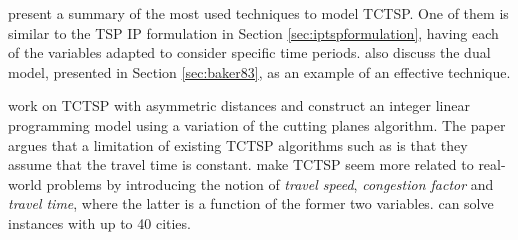 \documentclass{mprop}
\theoremstyle{definition}
\begin{document}


\citet{tspbible} present a summary of the most used techniques to model TCTSP. One of them is similar to the TSP IP formulation in Section \ref{sec:iptspformulation}, having each of the variables adapted to consider specific time periods. \citet{tspbible} also discuss the dual model, presented in Section \ref{sec:baker83}, as an example of an effective technique.

\citet{ariglianotime} work on TCTSP with asymmetric distances 
and construct an integer linear programming model using a variation of the cutting planes algorithm. The paper argues that a limitation of existing TCTSP algorithms such as \citep{Baker83} is that they assume that the travel time is constant. \citet{ariglianotime} make TCTSP seem more related to real-world problems by introducing the notion of \textit{travel speed}, \textit{congestion factor} and \textit{travel time}, where the latter is a function of the former two variables. \citet{ariglianotime} can solve instances with up to 40 cities.
\end{document}
